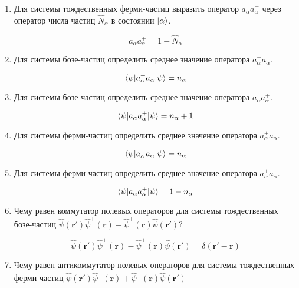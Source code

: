 \documentclass{article}
\begin{document}
\begin{enumerate}
	\item {Для системы тождественных ферми-частиц выразить оператор $a_\alpha a_\alpha^+$ через оператор числа частиц $\hat{N}_\alpha$ в состоянии $\ket{\alpha}$.}
	
	\begin{equation}
		a_\alpha a_\alpha^+  = 1 - \hat{N}_\alpha
	\end{equation}
	
	\item {Для системы бозе-частиц определить среднее значение оператора $a_\alpha^+ a_\alpha$.}
	
	\begin{equation}
		\braket{\psi| a_\alpha^+ a_\alpha|\psi} = n_\alpha
	\end{equation}
	
	\item {Для системы бозе-частиц определить среднее значение оператора $a_\alpha a_\alpha^+$.}
	
	\begin{equation}
		\braket{\psi| a_\alpha a_\alpha^+|\psi} = n_\alpha + 1
	\end{equation}
	
	\item {Для системы ферми-частиц определить среднее значение оператора $a_\alpha^+ a_\alpha$.}
	
	\begin{equation}
		\braket{\psi| a_\alpha^+ a_\alpha|\psi} = n_\alpha
	\end{equation}
	
	\item {Для системы ферми-частиц определить среднее значение оператора $a_\alpha^+ a_\alpha$.}
	
	\begin{equation}
		\braket{\psi| a_\alpha a_\alpha^+|\psi} = 1 - n_\alpha
	\end{equation}	
	
	\item {Чему равен коммутатор полевых операторов для системы тождественных бозе-частиц $\hat{\psi}(\textbf{r}')\hat{\psi}^+(\textbf{r})-\hat{\psi}^+(\textbf{r})\hat{\psi}(\textbf{r}')$?}
	
	\begin{equation}
		\hat{\psi}(\textbf{r}')\hat{\psi}^+(\textbf{r})-\hat{\psi}^+(\textbf{r})\hat{\psi}(\textbf{r}') = \delta(\textbf{r}' - \textbf{r})
	\end{equation}
	
	\item {Чему равен антикоммутатор полевых операторов для системы тождественных ферми-частиц $\hat{\psi}(\textbf{r}')\hat{\psi}^+(\textbf{r}) + \hat{\psi}^+(\textbf{r})\hat{\psi}(\textbf{r}')$}
	

\end{enumerate}
\end{document}
